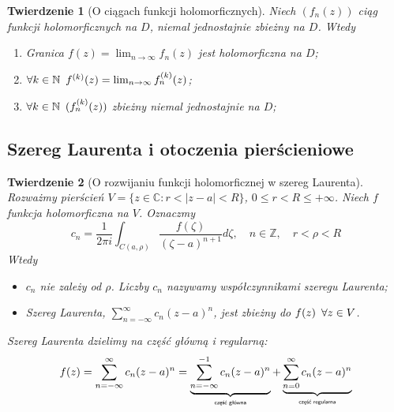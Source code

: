 \documentclass[11pt]{article}
\newcommand{\abs}[1]{\left|#1\right|} %
\theoremstyle{plain}
\newtheorem*{theorem}{Twierdzenie}
\theoremstyle{definition}
\theoremstyle{remark}
\begin{document}
\begin{theorem}[O ciągach funkcji holomorficznych]
  Niech $ (f_n(z)) $ ciąg funkcji holomorficznych na $D$, niemal jednostajnie zbieżny na $D$. Wtedy

  \begin{enumerate}
    \item Granica $ f(z) = \lim_{n \to \infty} f_n(z) $ jest holomorficzna na $ D $; \label{ciagi-holo-f}
    \item $ \forall k \in \mathbb{N}\enskip f^{(k)}(z) = \lim_{n \to \infty} f_n^{(k)}(z) $; \label{ciagi-holo-pochodne}
    \item $ \forall k \in \mathbb{N}\enskip (f_n^{(k)}(z)) $ zbieżny niemal jednostajnie na $D$; \label{ciagi-holo-pochodne-zb}
  \end{enumerate}
\end{theorem}

\subsection{Szereg Laurenta i otoczenia pierścieniowe}

\pagebreak

\begin{theorem}[O rozwijaniu funkcji holomorficznej w szereg Laurenta]
  Rozważmy pierścień $ V = \{z \in \mathbb{C}\colon r < \abs{z-a} < R\} $, $ 0 \leq r < R \leq +\infty $.
  Niech $ f $ funkcja holomorficzna na $ V $.
  Oznaczmy
  $$
    c_n = \frac{1}{2 \pi i} \int_{C(a, \rho)} \frac{f(\zeta)}{(\zeta - a)^{n+1}} d\zeta,
    \quad
    n \in \mathbb{Z},
    \quad
    r < \rho < R
  $$
  Wtedy

  \begin{itemize}
    \item $ c_n $ nie zależy od $ \rho $. Liczby $ c_n $ nazywamy współczynnikami szeregu Laurenta;
    \item Szereg Laurenta, $ \sum_{n = -\infty}^{\infty} c_n(z-a)^n $, jest zbieżny do $ f(z) \enskip \forall z \in V $.
  \end{itemize}

  Szereg Laurenta dzielimy na część główną i regularną:
  $$
    f(z) =
    \sum_{n = -\infty}^{\infty} c_n(z-a)^n =
    \underbrace{\sum_{n = -\infty}^{-1} c_n(z-a)^n}_\text{\normalfont\tiny\sffamily część główna} +
    \underbrace{\sum_{n = 0}^{\infty} c_n(z-a)^n}_\text{\normalfont\tiny\sffamily część regularna}
  $$
\end{theorem}
\end{document}
